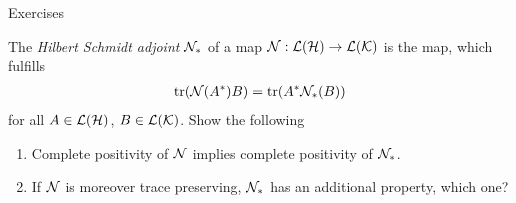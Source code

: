  \begin{section}{Exercises}
  	\begin{exercise}\label{ex:h_s_adjoint}
  	 The \emph{Hilbert Schmidt adjoint}  ${\mathcal N}_{\ast}$ of a map ${\mathcal N}: {\mathcal L}({\mathcal H}) \rightarrow {\mathcal L}({\mathcal K})$ is the map, which fulfills 
  	 \begin{align}
		\mathrm{tr}({\mathcal N}(A^\ast)B) = \mathrm{tr}(A^\ast {\mathcal N}_{\ast}(B)) 
  	 \end{align}	
  	 for all $A \in {\mathcal L}({\mathcal H})$, $B\in {\mathcal L}({\mathcal K})$. Show the following
  	 \begin{enumerate}
  	 	\item Complete positivity of ${\mathcal N}$ implies complete positivity of ${\mathcal N}_{\ast}$. 
  	 	\item If ${\mathcal N}$ is moreover trace preserving, ${\mathcal N}_\ast$ has an additional property, which one? 
  	 \end{enumerate}
  	\end{exercise}
  	
  	
  	
  	
  	
  	
  	
  	
  \end{section}
